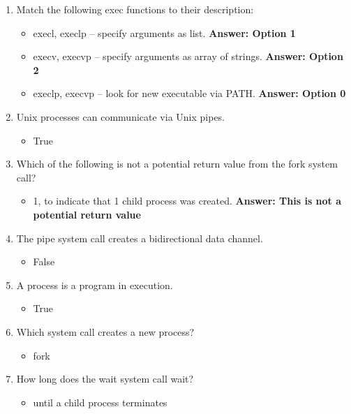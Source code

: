 \documentclass{report}
\begin{document}
    \pagebreak 
\begin{enumerate}
    \item Match the following exec functions to their description:
    \begin{itemize}
        \item execl, execlp -- specify arguments as list. \textbf{Answer: Option 1}
        \item execv, execvp -- specify arguments as array of strings. \textbf{Answer: Option 2}
        \item execlp, execvp -- look for new executable via PATH. \textbf{Answer: Option 0}
    \end{itemize}
    
    \item Unix processes can communicate via Unix pipes.
    \begin{itemize}
        \item True
    \end{itemize}
    
    \item Which of the following is not a potential return value from the fork system call?
    \begin{itemize}
        \item 1, to indicate that 1 child process was created. \textbf{Answer: This is not a potential return value}
    \end{itemize}
    
    \item The pipe system call creates a bidirectional data channel.
    \begin{itemize}
        \item False
    \end{itemize}
    
    \item A process is a program in execution.
    \begin{itemize}
        \item True
    \end{itemize}
    
    \item Which system call creates a new process?
    \begin{itemize}
        \item fork
    \end{itemize}
    
    \item How long does the wait system call wait?
    \begin{itemize}
        \item until a child process terminates
    \end{itemize}
    

\end{enumerate}
\end{document}
